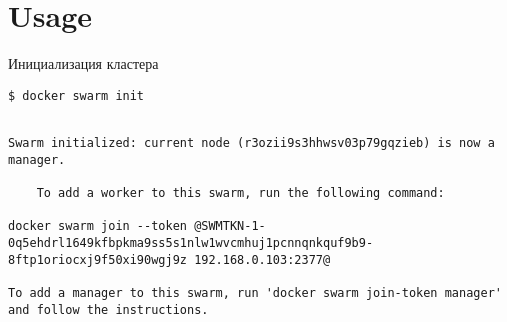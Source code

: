 \section{Usage}\label{sec:usage}

\begin{frame}[fragile]{Инициализация кластера}

    \begin{lstlisting}[style=base]
    $ docker swarm init 
    \end{lstlisting}

    \begin{lstlisting}[style=base]

Swarm initialized: current node (r3ozii9s3hhwsv03p79gqzieb) is now a manager.

    To add a worker to this swarm, run the following command:

docker swarm join --token @SWMTKN-1-0q5ehdrl1649kfbpkma9ss5s1nlw1wvcmhuj1pcnnqnkquf9b9-8ftp1oriocxj9f50xi90wgj9z 192.168.0.103:2377@

To add a manager to this swarm, run 'docker swarm join-token manager' and follow the instructions.

    \end{lstlisting}

\end{frame}

